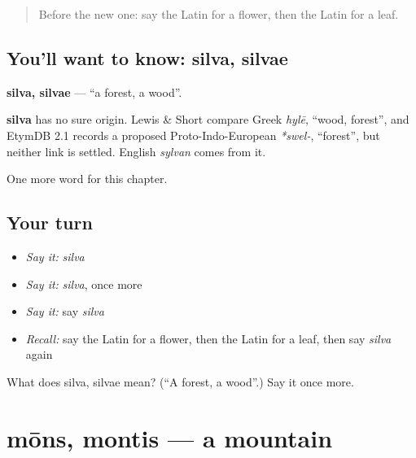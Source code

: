 \label{lesson:LA-C86-silva}



\begin{quote}
Before the new one: say the Latin for a flower, then the Latin for a leaf.
\end{quote}

\subsection*{You'll want to know: silva, silvae}
\textbf{silva, silvae} — \textquotedblleft{}a forest, a wood\textquotedblright{}.

\begin{cousinweb}
\textbf{silva} has no sure origin. Lewis \& Short compare Greek \emph{hylē}, \textquotedblleft{}wood, forest\textquotedblright{}, and EtymDB 2.1 records a proposed Proto-Indo-European \emph{*swel-}, \textquotedblleft{}forest\textquotedblright{}, but neither link is settled. English \emph{sylvan} comes from it.
\end{cousinweb}

\begin{grammarlens}[title={What you've built}]
One more word for this chapter.
\end{grammarlens}

\subsection*{Your turn}
\begin{itemize}
\raggedright
  \item \emph{Say it:} \emph{silva}
  \item \emph{Say it:} \emph{silva}, once more
  \item \emph{Say it:} say \emph{silva}
  \item \emph{Recall:} say the Latin for a flower, then the Latin for a leaf, then say \emph{silva} again
\end{itemize}

\begin{tcolorbox}[breakable,colback=teal!4,colframe=teal!35!black,title={Before you move on}]
What does silva, silvae mean? (\textquotedblleft{}A forest, a wood\textquotedblright{}.) Say it once more.
\end{tcolorbox}
\section[mōns, montis]{mōns, montis — a mountain}

